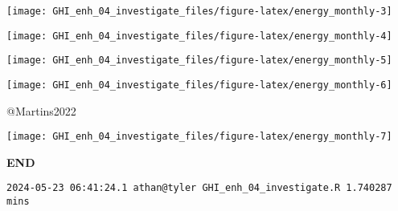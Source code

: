 \documentclass[
  10pt,
  a4paper,oneside]{article}
\begin{document}
\begin{center}\texttt{[image: GHI\_enh\_04\_investigate\_files/figure-latex/energy\_monthly-3]} \end{center}

\begin{center}\texttt{[image: GHI\_enh\_04\_investigate\_files/figure-latex/energy\_monthly-4]} \end{center}

\begin{center}\texttt{[image: GHI\_enh\_04\_investigate\_files/figure-latex/energy\_monthly-5]} \end{center}

\begin{center}\texttt{[image: GHI\_enh\_04\_investigate\_files/figure-latex/energy\_monthly-6]} \end{center}

@Martins2022

\begin{center}\texttt{[image: GHI\_enh\_04\_investigate\_files/figure-latex/energy\_monthly-7]} \end{center}

\textbf{END}

\begin{verbatim}
2024-05-23 06:41:24.1 athan@tyler GHI_enh_04_investigate.R 1.740287 mins
\end{verbatim}
\end{document}

